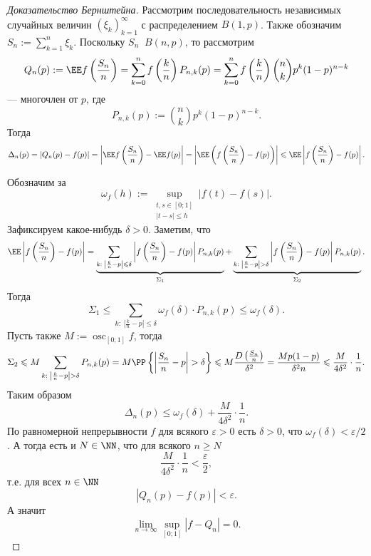 \documentclass[12pt,a4paper]{article}
\DeclareMathOperator*{\osc}{osc}
\newcommand{\Deq}{\mathop{\stackrel{\mathcal{D}}{=}}}
\begin{document}
    \begin{proof}[Доказательство Бернштейна]
        Рассмотрим последовательность независимых случайных величин $(\xi_k)_{k=1}^\infty$ с распределением $B(1, p)$. Также обозначим $S_n := \sum_{k=1}^n \xi_k$. Поскольку $S_n \Deq B(n, p)$, то рассмотрим
        \[Q_n(p) := \EE f\left(\frac{S_n}{n}\right) = \sum_{k=0}^n f\left(\frac{k}{n}\right) P_{n,k}(p) = \sum_{k=0}^n f\left(\frac{k}{n}\right) \binom{n}{k} p^k (1-p)^{n-k}\]
        --- многочлен от $p$, где
        \[P_{n, k}(p) := \binom{n}{k} p^k (1-p)^{n-k}.\]
        Тогда
        \[
            \Delta_n(p)
            = |Q_n(p) - f(p)|
            = \left|\EE f\left(\frac{S_n}{n}\right) - \EE f(p)\right|
            = \left|\EE \left(f\left(\frac{S_n}{n}\right) - f(p)\right)\right|
            \leqslant \EE \left|f\left(\frac{S_n}{n}\right) - f(p)\right|.
        \]

        Обозначим за
        \[\omega_f(h) := \sup_{\substack{t, s \in [0; 1]\\ |t-s| \leqslant h}} |f(t) - f(s)|.\]
        Зафиксируем какое-нибудь $\delta > 0$. Заметим, что
        \[
            \EE \left|f\left(\frac{S_n}{n}\right) - f(p)\right| =
            \underbrace{\sum_{k:\; \left|\frac{k}{n} - p\right| \leqslant \delta} \left|f\left(\frac{S_n}{n}\right) - f(p)\right| P_{n, k}(p)}_{\Sigma_1} +
            \underbrace{\sum_{k:\; \left|\frac{k}{n} - p\right| > \delta} \left|f\left(\frac{S_n}{n}\right) - f(p)\right| P_{n, k}(p)}_{\Sigma_2}.
        \]
        Тогда
        \[
            \Sigma_1
            \leqslant \sum_{k:\; \left|\frac{k}{n} - p\right| \leqslant \delta} \omega_f(\delta) \cdot P_{n, k}(p)
            \leqslant \omega_f(\delta).
        \]
        Пусть также $M := \osc_{[0; 1]} f$, тогда
        \[
            \Sigma_2
            \leqslant M \sum_{k:\; \left|\frac{k}{n} - p\right| > \delta} P_{n, k}(p)
            = M \PP\left\{\left|\frac{S_n}{n}-p\right| > \delta\right\}
            \leqslant M \frac{D\left(\frac{S_n}{n}\right)}{\delta^2}
            = \frac{Mp(1-p)}{\delta^2 n}
            \leqslant \frac{M}{4\delta^2} \cdot \frac{1}{n}.
        \]
        Таким образом
        \[\Delta_n(p) \leqslant \omega_f(\delta) + \frac{M}{4\delta^2} \cdot \frac{1}{n}.\]
        По равномерной непрерывности $f$ для всякого $\varepsilon > 0$ есть $\delta > 0$, что $\omega_f(\delta) < \varepsilon/2$. А тогда есть и $N \in \NN$, что для всякого $n \geqslant N$
        \[\frac{M}{4\delta^2} \cdot \frac{1}{n} < \frac{\varepsilon}{2},\]
        т.е. для всех $n \in \NN$
        \[|Q_n(p) - f(p)| < \varepsilon.\]
        А значит
        \[\lim_{n \to \infty} \sup_{[0; 1]} |f - Q_n| = 0.\]
    \end{proof}
\end{document}
